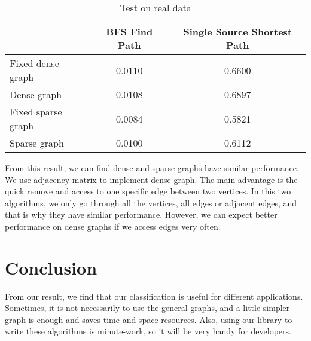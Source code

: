 \documentclass{article}
\begin{document}
       	\begin{table}
   	\begin{center}
   		\begin{tabular}{|l|c|c|}
   			\hline
   			& BFS Find Path & Single Source Shortest Path\\
   			\hline
   			\hline 
   			Fixed dense graph & 0.0110 & 0.6600\\
   			\hline
   			Dense graph &  0.0108 & 0.6897\\
   			\hline
   			Fixed sparse graph & 0.0084& 0.5821\\
   			\hline
   			Sparse graph &  0.0100 & 0.6112\\
   			\hline
   		\end{tabular}
   	\end{center}
   	\caption{Test on real data}
   	\label{tab:test1}
   \end{table}
From this result, we can find dense and sparse graphs have similar performance. We use adjacency matrix to implement dense graph. The main advantage is the quick remove and access to one specific edge between two vertices. In this two algorithms, we only go through all the vertices, all edges or adjacent edges, and that is why they have similar performance. However, we can expect better performance on dense graphs if we access edges very often.

\section{Conclusion}
From our result, we find that our classification is useful for different applications. Sometimes, it is not necessarily to use the general graphs, and a little simpler graph is enough and saves time and space resources. Also, using our library to write these algorithms is minute-work, so it will be very handy for developers.
\end{document}

